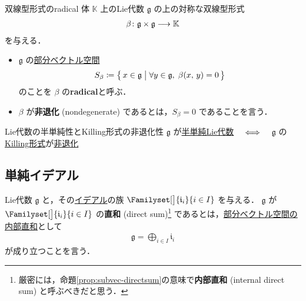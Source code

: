 \documentclass[rep_main]{subfiles}
\begin{document}
\begin{mydef}[label=def:radical-bilinear]{双線型形式のradical}
	体 $\mathbb{K}$ 上のLie代数 $\mathfrak{g}$ の上の対称な双線型形式
	\begin{align}
		\beta \colon \mathfrak{g} \times \mathfrak{g} \longrightarrow \mathbb{K}
	\end{align}
	を与える．
	\begin{itemize}
		\item $\mathfrak{g}$ の\underline{部分ベクトル空間}
		\begin{align}
			S_\beta \coloneqq \bigl\{\, x \in \mathfrak{g} \bigm| \forall y \in \mathfrak{g},\; \beta(x,\, y) = 0 \,\bigr\} 
		\end{align}
		のことを $\beta$ の\textbf{radical}と呼ぶ．
		\item $\beta$ が\textbf{非退化} (nondegenerate) であるとは，$S_\beta = 0$ であることを言う．
	\end{itemize}
	
\end{mydef}

\begin{mytheo}[label=thm:semisimple-LieAlg-iff]{Lie代数の半単純性とKilling形式の非退化性}
	$\mathfrak{g}$ が\hyperref[def:semisimple-LieAlg]{半単純Lie代数}
	$\quad \Longleftrightarrow \quad$ $\mathfrak{g}$ の\hyperref[def:Killing-form]{Killing形式}が\hyperref[def:radical-bilinear]{非退化}
\end{mytheo}


\subsection{単純イデアル}

Lie代数 $\mathfrak{g}$ と，その\hyperref[def:ideal-LieAlg]{イデアル}の族 $\Familyset[\big]{\mathfrak{i}_i}{i \in I}$ を与える．
$\mathfrak{g}$ が $\Familyset[\big]{\mathfrak{i}_i}{i \in I}$ の\textbf{直和} (direct sum)\footnote{厳密には，命題\ref{prop:subvec-directsum}の意味で\textbf{内部直和} (internal direct sum) と呼ぶべきだと思う．} 
であるとは，\hyperref[prop:subvec-directsum]{部分ベクトル空間の内部直和}として
\begin{align}
	\mathfrak{g} = \bigoplus_{i \in I} \mathfrak{i}_i
\end{align}
が成り立つことを言う．
\end{document}
